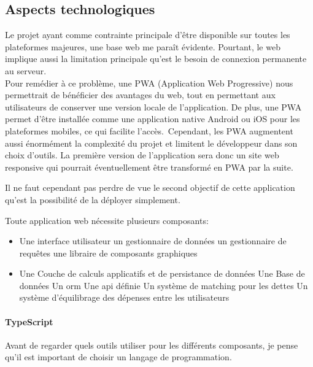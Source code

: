 
\subsection{Aspects technologiques}\label{subsec:aspects-technologiques}
Le projet ayant comme contrainte principale d'être disponible sur toutes les plateformes majeures, une base web me paraît évidente.
Pourtant, le web implique aussi la limitation principale qu'est le besoin de connexion permanente au serveur.\\

Pour remédier à ce problème, une PWA (Application Web Progressive) nous permettrait de bénéficier des avantages du web,
tout en permettant aux utilisateurs de conserver une version locale de l'application.
De plus, une PWA permet d'être installée comme une application native Android ou iOS pour les plateformes mobiles, ce qui facilite l'accès.\
Cependant, les PWA augmentent aussi énormément la complexité du projet et limitent le développeur dans son choix d'outils.
La première version de l'application sera donc un site web responsive qui pourrait éventuellement être transformé en PWA par la suite.

Il ne faut cependant pas perdre de vue le second objectif de cette application qu'est la possibilité de la déployer simplement.

Toute application web nécessite plusieurs composants:
\begin{itemize}
    \item Une interface utilisateur
    \subitem un gestionnaire de données
    \subitem un gestionnaire de requêtes
    \subitem une libraire de composants graphiques
    \item Une Couche de calculs applicatifs et de persistance de données
    \subitem Une Base de données
    \subitem Un \Gls{orm}
    \subitem Une \Gls{api} définie
    \subitem Un système de matching pour les dettes
    \subitem Un système d'équilibrage des dépenses entre les utilisateurs
\end{itemize}

\paragraph{TypeScript}
Avant de regarder quels outils utiliser pour les différents composants, je pense qu'il est important de choisir un langage de programmation.\\

